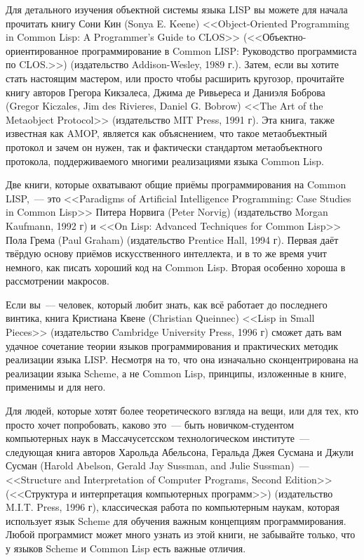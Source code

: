 Для детального изучения объектной системы языка LISP вы можете для начала прочитать книгу
Сони Кин (Sonya E. Keene) <<Object-Oriented Programming in Common Lisp: A Programmer's
Guide to CLOS>> (<<Объектно-ориентированное программирование в Common LISP: Руководство
программиста по CLOS.>>) (издательство Addison-Wesley, 1989 г.). Затем, если вы хотите
стать настоящим мастером, или просто чтобы расширить кругозор, прочитайте книгу авторов
Грегора Кикзалеса, Джима де Ривьереса и Даниэля Боброва (Gregor Kiczales, Jim des
Rivieres, Daniel G. Bobrow) <<The Art of the Metaobject Protocol>> (издательство MIT
Press, 1991 г). Эта книга, также известная как AMOP, является как объяснением, что такое
метаобъектный протокол и зачем он нужен, так и фактически стандартом метаобъектного
протокола, поддерживаемого многими реализациями языка Common Lisp.

Две книги, которые охватывают общие приёмы программирования на Common LISP,~--- это
<<Paradigms of Artificial Intelligence Programming: Case Studies in Common Lisp>> Питера
Норвига (Peter Norvig) (издательство Morgan Kaufmann, 1992 г) и <<On Lisp: Advanced
Techniques for Common Lisp>> Пола Грема (Paul Graham) (издательство Prentice Hall, 1994
г). Первая даёт твёрдую основу приёмов искусственного интеллекта, и в то же время учит
немного, как писать хороший код на Common Lisp. Вторая особенно хороша в рассмотрении
макросов.

Если вы~--- человек, который любит знать, как всё работает до последнего винтика, книга
Кристиана Квене (Christian Queinnec) <<Lisp in Small Pieces>> (издательство Cambridge
University Press, 1996 г) сможет дать вам удачное сочетание теории языков программирования
и практических методик реализации языка LISP. Несмотря на то, что она изначально
сконцентрирована на реализации языка Scheme, а не Common Lisp, принципы, изложенные в
книге, применимы и для него.

Для людей, которые хотят более теоретического взгляда на вещи, или для тех, кто просто
хочет попробовать, каково это~--- быть новичком-студентом компьютерных наук в
Массачусетсском технологическом институте~--- следующая книга авторов Харольда Абельсона,
Геральда Джея Сусмана и Джули Сусман (Harold Abelson, Gerald Jay Sussman, and Julie
Sussman)~--- <<Structure and Interpretation of Computer Programs, Second Edition>>
(<<Структура и интерпретация компьютерных программ>>) (издательство M.I.T. Press, 1996 г),
классическая работа по компьютерным наукам, которая использует язык Scheme для обучения
важным концепциям программирования. Любой программист может много узнать из этой книги, не
забывайте только, что у языков Scheme и Common Lisp есть важные отличия.

